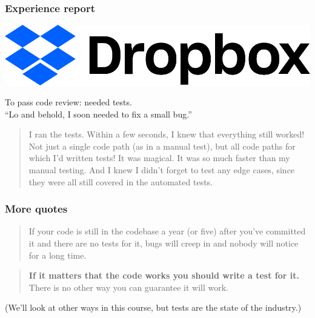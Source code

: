 \documentclass{beamer}
\newenvironment{changemargin}[1]{%
  \begin{list}{}{%
    \setlength{\topsep}{0pt}%
    \setlength{\leftmargin}{#1}%
    \setlength{\rightmargin}{1em}
    \setlength{\listparindent}{\parindent}%
    \setlength{\itemindent}{\parindent}%
    \setlength{\parsep}{\parskip}%
  }%
  \item[]}{\end{list}}
\begin{document}
\begin{frame}
  \frametitle{Experience report}
  \begin{center}
    \includegraphics[width=.6\paperwidth]{L02/Dropbox_logo_2017.png} \\
  \end{center}
  \begin{changemargin}{2em}
    \large
    To pass code review: needed tests.\\[0.5em]
    ``Lo and behold, I soon needed to fix a small bug.'' \\[1em]
  \end{changemargin}

  \begin{quote}
I ran the tests. Within a few seconds, I knew that everything still worked! Not just a single code path (as in a manual test), but all code paths for which I’d written tests! It was magical. It was so much faster than my manual testing. And I knew I didn’t forget to test any edge cases, since they were all still covered in the automated tests.
\end{quote}

\end{frame}

\begin{frame}
  \frametitle{More quotes}
  \begin{changemargin}{2em}
    \Large
\begin{quote}
If your code is still in the codebase a year (or five) after you've
committed it and there are no tests for it, bugs will creep in and
nobody will notice for a long time.\\[1em]
\end{quote}

\begin{quote}
\textbf{If it matters that the code works you should write a test for it.} There is no other way you can guarantee it will work.
\end{quote}

(We'll look at other ways in this course, but tests are the state of the industry.)

  \end{changemargin}
\end{frame}
\end{document}
